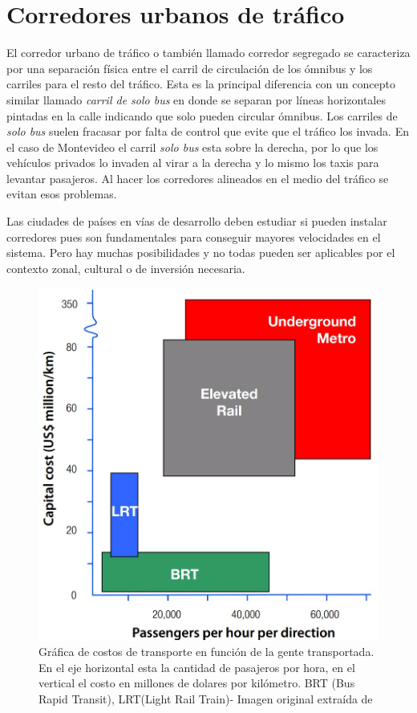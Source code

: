 \section{Corredores urbanos de tráfico}

El corredor urbano de tráfico o también llamado corredor segregado se caracteriza por una separación física entre el carril de circulación de los ómnibus y los carriles para el resto del tráfico. 
Esta es la principal diferencia con un concepto similar llamado \emph{carril de solo bus} en donde se separan por líneas horizontales pintadas en la calle indicando que solo pueden circular ómnibus. Los carriles de \emph{solo bus} suelen fracasar por falta de control que evite que el tráfico los invada. En el caso de Montevideo el carril \emph{solo bus} esta sobre la derecha, por lo que los vehículos privados lo invaden al virar a la derecha y lo mismo los taxis para levantar pasajeros. Al hacer los corredores alineados en el medio del tráfico se evitan esos problemas.  

Las ciudades de países en vías de desarrollo deben estudiar si pueden instalar corredores pues son fundamentales para conseguir mayores velocidades en el sistema. Pero hay muchas posibilidades y no todas pueden ser aplicables por el contexto zonal, cultural o de inversión necesaria.

\begin{figure}[H]
	\centering
	\includegraphics[width=0.5\linewidth]{Figures/costo_transporte}
	\caption{Gráfica de costos de transporte en función de la gente transportada. En el eje horizontal esta la cantidad de pasajeros por hora, en el vertical el costo en millones de dolares por kilómetro.  BRT (Bus Rapid Transit), LRT(Light Rail Train)- Imagen original extraída de \citep{ITDP}		
	}
	\label{fig:Grafica de costos de otros medios de transporte}
\end{figure}

